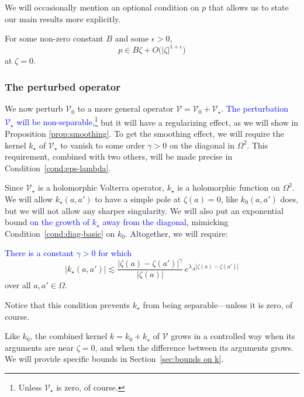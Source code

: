 \documentclass[review]{siamart220329}
\makeatletter
\newcommand{\condconst}[2]{\item[($\text{\textsc{#1}} \mid #2$)]\protected@edef\@currentlabel{$\text{\textsc{#1}} \mid #2$}}
\newcommand{\volterra}{\mathcal{V}}
\newcommand{\hardpart}{\mathcal{V}_0}
\newcommand{\softpart}{\mathcal{V}_\star}
\newcommand{\hardker}{k_0}
\newcommand{\softker}{k_\star}
\newcommand{\domain}{\Omega}
\makeatother
\begin{document}
We will occasionally mention an optional condition on $p$ that allows us to state our main results more explicitly.
\begin{conditions}
\condconst{reg-p}{B, \epsilon}\label{cond:reg-p}
For some non-zero constant $B$ and some $\epsilon > 0$,
\[ p \in B\zeta + O\big(|\zeta|^{1 + \epsilon}\big) \]
at $\zeta = 0$.
\end{conditions}
\subsubsection{The perturbed operator}\label{setting:perturbed}

We now perturb $\hardpart$ to a more general operator $\volterra=\hardpart +\softpart$. \textcolor{blue}{The perturbation $\softpart$ will be non-separable,}\footnote{Unless $\softpart$ is zero, of course.} but it will have a regularizing effect, as we will show in Proposition \ref{prop:smoothing}. To get the smoothing effect, we will require the kernel $\softker$ of $\softpart$ to vanish to some order $\gamma > 0$ on the diagonal in $\domain^2$. This requirement, combined with two others, will be made precise in Condition~\eqref{cond:eps-lambda}.

Since $\softpart$ is a holomorphic Volterra operator, $\softker$ is a holomorphic function on $\domain^2$. We will allow $\softker(a, a')$ to have a simple pole at $\zeta(a) = 0$, like $\hardker(a, a')$ does, but we will not allow any sharper singularity. We will also put an exponential bound \textcolor{blue}{on the growth of $\softker$ away from the diagonal}, mimicking Condition~\eqref{cond:diag-basic} on $\hardker$. Altogether, we will require:
\begin{conditions}
\condconst{diag$_\star$}{\gamma, \lambda_\Delta}\label{cond:eps-lambda} \textcolor{blue}{There is a constant $\gamma > 0$ for which}
\[ |\softker(a, a')| \lesssim\frac{|\zeta(a)-\zeta(a')|^\gamma}{|\zeta(a)|}\,e^{\lambda_\Delta|\zeta(a)-\zeta(a')|}\]
over all $a, a' \in \domain$.
\end{conditions}
Notice that this condition prevents $\softker$ from being separable---unless it is zero, of course.

Like $\hardker$, the combined kernel $k = \hardker + \softker$ of $\volterra$ grows in a controlled way when its arguments are near $\zeta = 0$, and when the difference between its arguments grows. We will provide specific bounds in Section~\ref{sec:bounds on k}. 
\end{document}
